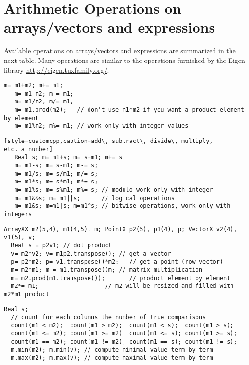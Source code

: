 \documentclass[a4paper,10pt]{article}
\begin{document}
\section{Arithmetic Operations on arrays/vectors and expressions}

Available operations on arrays/vectors and expressions are summarized in the next table.
Many operations are similar to the operations
furnished by the Eigen library \url{http://eigen.tuxfamily.org/}.

\begin{lstlisting}[style=customcpp,caption=add\, subtract\, divide\, multiply arrays element by element"]
   m= m1+m2; m+= m1;
   m= m1-m2; m-= m1;
   m= m1/m2; m/= m1;
   m= m1.prod(m2);   // don't use m1*m2 if you want a product element by element
   m= m1%m2; m%= m1; // work only with integer values
\end{lstlisting}

\begin{lstlisting}[style=customcpp,caption=add\, subtract\, divide\, multiply,
etc. a number]
   Real s; m= m1+s; m= s+m1; m+= s;
   m= m1-s; m= s-m1; m-= s;
   m= m1/s; m= s/m1; m/= s;
   m= m1*s; m= s*m1; m*= s;
   m= m1%s; m= s%m1; m%= s; // modulo work only with integer
   m= m1&&s; m= m1||s;      // logical operations
   m= m1&s; m=m1|s; m=m1^s; // bitwise operations, work only with integers
\end{lstlisting}

\begin{lstlisting}[style=customcpp,caption=matrix by matrix/vector products]
  ArrayXX m2(5,4), m1(4,5), m; PointX p2(5), p1(4), p; VectorX v2(4), v1(5), v;
  Real s = p2v1; // dot product
  v= m2*v2; v= m1p2.transpose(); // get a vector
  p= p2*m2; p= v1.transpose()*m2;   // get a point (row-vector)
  m= m2*m1; m = m1.transpose()m; // matrix multiplication
  m= m2.prod(m1.transpose());       // product element by element
  m2*= m1;                   // m2 will be resized and filled with m2*m1 product
\end{lstlisting}

\begin{lstlisting}[style=customcpp,caption=Comparisons operators]
  Real s;
  // count for each columns the number of true comparisons
  count(m1 < m2);  count(m1 > m2);  count(m1 < s);  count(m1 > s);
  count(m1 <= m2); count(m1 >= m2); count(m1 <= s); count(m1 >= s);
  count(m1 == m2); count(m1 != m2); count(m1 == s); count(m1 != s);
  m.min(m2); m.min(v); // compute minimal value term by term
  m.max(m2); m.max(v); // compute maximal value term by term
\end{lstlisting}
\end{document}
